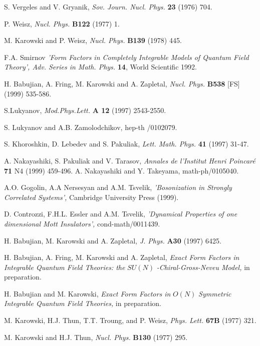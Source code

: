 \documentclass[a4paper,a4paper]{article}
\begin{document}
\begin{thebibliography}{99}
  S. Vergeles and V. Gryanik, \emph{Sov. Journ. Nucl. Phys.} 
\textbf{23} (1976) 704.

  P. Weisz, \emph{Nucl. Phys.} \textbf{B122} (1977) 1.

  M. Karowski and P. Weisz, \emph{Nucl. Phys.} \textbf{B139}
(1978) 445.

  F.A. Smirnov \emph{'Form Factors in Completely Integrable
Models of Quantum Field Theory', Adv. Series in Math. Phys.} \textbf{14},
World Scientific 1992.

  H. Babujian, A. Fring, M. Karowski and A. Zapletal, \emph{%
Nucl. Phys.} \textbf{B538} [FS] (1999) 535-586.

  S.Lukyanov, \emph{Mod.Phys.Lett.} \textbf{A 12} (1997)
2543-2550.

  S. Lukyanov and A.B. Zamolodchikov, hep-th /0102079.

  S. Khoroshkin, D. Lebedev and S. Pakuliak, \emph{Lett. Math.
Phys. }\textbf{41} (1997) 31-47.

  A. Nakayashiki, S. Pakuliak and V. Tarasov, \emph{Annales de
l'Institut Henri Poincar\'{e} }\textbf{71 }N4 (1999) 459-496.
  A. Nakayashiki and Y. Takeyama, math-ph/0105040.

  A.O. Gogolin, A.A Nersesyan and A.M. Tsvelik, \emph{%
'Bosonization in Strongly Correlated Systems', }Cambridge University Press
(1999).

  D. Controzzi, F.H.L. Essler and A.M. Tsvelik, \emph{%
'Dynamical Properties of one dimensional Mott Insulators', }%
cond-math/0011439.

  H. Babujian, M. Karowski and A. Zapletal, \emph{J. Phys.} 
\textbf{A30} (1997) 6425.

  H. Babujian, A. Fring, M. Karowski and A. Zapletal, \emph{%
Exact Form Factors in Integrable Quantum Field Theories: the }$SU(N)$\emph{%
-Chiral-Gross-Neveu Model,} in preparation.

  H. Babujian and M. Karowski, \emph{Exact Form Factors in }$%
O(N)$ \emph{Symmetric Integrable Quantum Field Theories,} in preparation.

  M. Karowski, H.J. Thun, T.T. Troung, and P. Weisz, \emph{%
Phys. Lett.} \textbf{67B} (1977) 321.

  M. Karowski and H.J. Thun, \emph{Nucl. Phys.} \textbf{B130}
(1977) 295.


\end{thebibliography}
\end{document}
